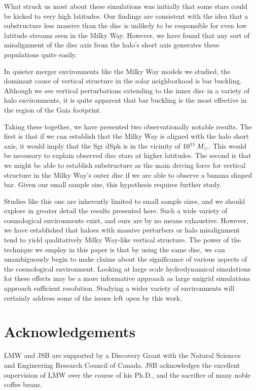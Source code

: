 What struck us most about these simulations was initially that some stars could be kicked to very high latitudes. Our findings are consistent with the idea that a substructure less massive than the disc is unlikely to be responsible for even low latitude streams seen in the Milky Way. However, we have found that any sort of misalignment of the disc axis from the halo's short axis generates these populations quite easily.

In quieter merger environments like the Milky Way models we studied, the dominant cause of vertical structure in the solar neighborhood is bar buckling. Although  we see vertical perturbations extending to the inner disc in a variety of halo environments, it is quite apparent that bar buckling is the most effective in the region of the Gaia footprint.

Taking these together, we have presented two observationally notable results. The first is that if we can establish that the Milky Way is aligned with the halo short axis, it would imply that the Sgr dSph is in the vicinity of $10^{11}\,M_\odot$. This would be necessary to explain observed disc stars at higher latitudes. The second is that we might be able to establish substructure as the main driving force for vertical structure in the Milky Way's outer disc if we are able to observe a banana shaped bar. Given our small sample size, this hypothesis requires further study.

Studies like this one are inherently limited to small sample sizes, and we should explore in greater detail the results presented here. Such a wide variety of cosmological environments exist, and ours are by no means exhaustive. However, we have established that haloes with massive perturbers or halo misalignment tend to yield qualitatively Milky Way-like vertical structure. The power of the technique we employ in this paper is that by using the same disc, we can unambiguously begin to make claims about the significance of various aspects of the cosmological environment. Looking at large scale hydrodynamical simulations for these effects may be a more informative approach as large unigrid simulations approach sufficient resolution. Studying a wider variety of environments will certainly address some of the issues left open by this work. 

\section*{Acknowledgements}
{LMW and JSB are supported by a Discovery Grant with the Natural
  Sciences and Engineering Research Council of Canada. JSB acknowledges the excellent
  supervision of LMW over the course of his Ph.D., and the sacrifice of many noble 
  coffee beans.}









